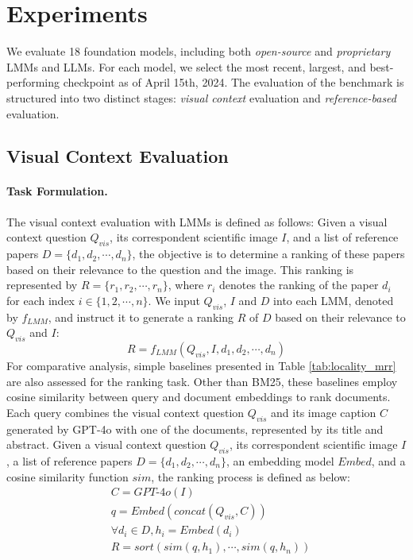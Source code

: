 


\section{Experiments}

We evaluate 18 foundation models, including both \emph{open-source} and \emph{proprietary} LMMs and LLMs. 
%
For each model, we select the most recent, largest, and best-performing checkpoint as of April 15th, 2024. 
%
The evaluation of the \data benchmark is structured into two distinct stages: \emph{visual context} evaluation and \emph{reference-based} evaluation.


\subsection{Visual Context Evaluation}

\paragraph{Task Formulation.}
The visual context evaluation with LMMs is defined as follows: 
%
Given a visual context question $Q_{vis}$, its correspondent scientific image $I$, and a list of reference papers $D = \{d_1, d_2, \cdots, d_n\}$, the objective is to determine a ranking of these papers based on their relevance to the question and the image. 
%
This ranking is represented by $R = \{r_1, r_2, \cdots, r_n\}$, where $r_i$ denotes the ranking of the paper $d_i$ for each index $i \in \{1, 2, \cdots, n\}$.
%
We input $Q_{vis}$, $I$ and $D$ into each LMM, denoted by $f_{LMM}$, and instruct it to generate a ranking $R$ of $D$ based on their relevance to $Q_{vis}$ and $I$:
\begin{equation*}
    R = f_{LMM}(Q_{vis}, I, d_1, d_2, \cdots, d_n)
\end{equation*}
For comparative analysis, simple baselines presented in Table \ref{tab:locality_mrr} are also assessed for the ranking task. 
%
Other than BM25, these baselines employ cosine similarity between query and document embeddings to rank documents. 
%
Each query combines the visual context question $Q_{vis}$ and its image caption $C$ generated by GPT-4o with one of the documents, represented by its title and abstract. 
%
Given a visual context question $Q_{vis}$, its correspondent scientific image $I$, a list of reference papers $D = \{d_1, d_2, \cdots, d_n\}$, an embedding model $\textit{Embed}$, and a cosine similarity function $\textit{sim}$, the ranking process is defined as below:
\begin{equation*}
    \begin{aligned}
        &C = \textit{GPT-4o}(I)\\
        &q = \textit{Embed}(\textit{concat}(Q_{vis}, C))\\
        &\forall d_i \in D, h_i = \textit{Embed}(d_i)\\
        &R = \textit{sort}(sim(q, h_1), \cdots, sim(q, h_n))
    \end{aligned}
\end{equation*}




